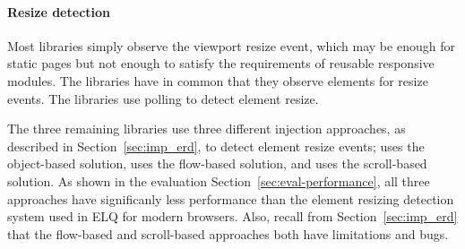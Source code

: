 \documentclass{acm_proc_article-sp}
\newcommand{\gls}[1]{#1}
\begin{document}
  \paragraph{Resize detection}
  Most libraries simply observe the \gls{viewport} resize event, which may be enough for static pages but not enough to satisfy the requirements of reusable responsive modules.
  The libraries \cite{eq_imp_localised-css,eq_imp_selector_queries,eq_imp_prollyfill-min-width,eq_imp_gss,eq_imp_element-queries,eq_imp_css-element-queries} have in common that they observe elements for resize events.
  The libraries \cite{eq_imp_localised-css,eq_imp_selector_queries} use polling to detect element resize.

  The three remaining libraries use three different injection approaches, as described in Section~\ref{sec:imp_erd}, to detect element resize events; \cite{eq_imp_element-queries} uses the object-based solution, \cite{eq_imp_prollyfill-min-width} uses the flow-based solution, and \cite{eq_imp_css-element-queries} uses the scroll-based solution.
  As shown in the evaluation Section~\ref{sec:eval-performance}, all three approaches have significanly less performance than the element resizing detection system used in \gls{ELQ} for modern browsers.
  Also, recall from Section~\ref{sec:imp_erd} that the flow-based and scroll-based approaches both have limitations and bugs.
\end{document}

